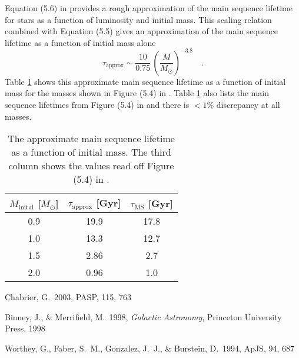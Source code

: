 \documentclass[11pt]{article}
\newcommand{\tab}[1]{Table \ref{tab:#1}}
\newcommand{\tablabel}[1]{\label{tab:#1}}
\newcommand{\sun}{\odot}
\begin{document}
Equation (5.6) in \citet{BM} provides a rough approximation of the main
sequence lifetime for stars as a function of luminosity and initial mass.
This scaling relation combined with Equation (5.5) gives an approximation
of the main sequence lifetime as a function of initial mass alone
\begin{equation}
    \tau_\mathrm{approx} \sim \frac{10}{0.75} \, \left ( \frac{M}{M_\sun}
    \right )^{-3.8}
    \quad.
\end{equation}
\tab{mslt} shows this approximate main sequence lifetime as a function of
initial mass for the masses shown in Figure (5.4) in \citet{BM}. \tab{mslt}
also lists the main sequence lifetimes from Figure (5.4) in \citet{BM} and
there is $< 1\%$ discrepancy at all masses.


\begin{table}

    \centering

    \begin{tabular}{c c c}

        $M_\mathrm{inital}$ [$M_\sun$] & $\tau_\mathrm{approx}$ [Gyr] &
        $\tau_\mathrm{MS}$ [Gyr] \\

        \hline

        0.9 & 19.9 & 17.8 \\
        1.0 & 13.3 & 12.7 \\
        1.5 & 2.86 & 2.7  \\
        2.0 & 0.96 & 1.0  \\

    \end{tabular}

    \caption{The approximate main sequence lifetime as a function of initial
    mass. The third column shows the values read off Figure (5.4) in
    \citet{BM}. \tablabel{mslt}}

\end{table}


\newpage

\begin{thebibliography}{}
\raggedright


 Chabrier, G.\ 2003, PASP,
    115, 763

    Binney, J., \& Merrifield, M.\ 1998, \emph{Galactic Astronomy},
    Princeton University Press, 1998

 Worthey, G., Faber,
    S.~M., Gonzalez, J.~J., \& Burstein, D.\ 1994, ApJS, 94, 687


\end{thebibliography}
\end{document}
